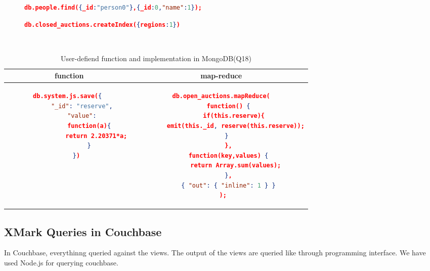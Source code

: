 \begin{figure}
\centering
\begin{lstlisting}[language=JSON, caption=XMark Query Q1 in MongoDB, label=mongo-xmark-q1]
		db.people.find({_id:"person0"},{_id:0,"name":1});
\end{lstlisting}

\centering
\begin{lstlisting}[language=JSON, caption=MongoDB secondary Index, label=mongodb-create-index]
             db.closed_auctions.createIndex({regions:1})
\end{lstlisting}

\begin{lstlisting}[language=JSON, caption=user-defined function in MongoDB, label=mongodb-user-defined-function]
         
\end{lstlisting}
\end{figure}



\begin{longtable}{c|c}
	\caption{ User-defiend function and implementation in MongoDB(Q18)}
	\label{tbl:mongodb-q18}\\
    {function } & {map-reduce}\\
	\hline
\begin{minipage}{.4\textwidth}
\begin{lstlisting}[language=JSON,basicstyle =\scriptsize]
    db.system.js.save({ 
        "_id": "reserve", 
        "value": 
            function(a){ 
                return 2.20371*a; 
            } 
    })
\end{lstlisting}
\end{minipage} &
\begin{minipage}{.4\textwidth}
\begin{lstlisting}[language=JSON,basicstyle =\scriptsize]
db.open_auctions.mapReduce(
    function() {
       if(this.reserve){
        emit(this._id, reserve(this.reserve));
       }    
    },
    function(key,values) {
        return Array.sum(values);
    },
    { "out": { "inline": 1 } }
 );
\end{lstlisting}
\end{minipage}
\end{longtable}


\subsection{XMark Queries in Couchbase}
 In Couchbase, everythinng queried against the views. The output of the views are queried like through programming interface. We have used Node.js for querying couchbase. 
 
